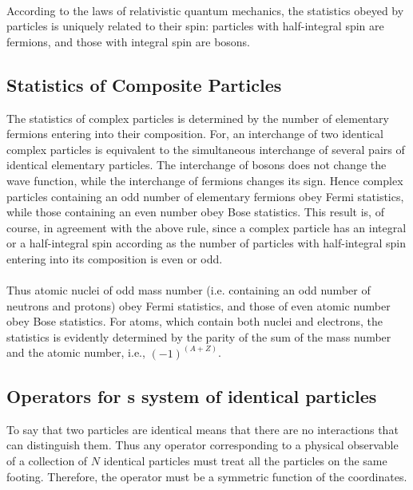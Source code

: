 \paragraph{}
According to the laws of relativistic 
quantum mechanics, the statistics obeyed by particles is uniquely 
related to their spin: particles with half-integral spin are fermions, 
and those with integral spin are bosons. 


\subsection{Statistics of Composite Particles}
The statistics of complex particles is determined by the 
number of elementary fermions entering into their composition. 
For, an interchange of two identical complex particles is equivalent to 
the simultaneous interchange of several pairs of identical elementary 
particles. The interchange of bosons does not change the wave function, 
while the interchange of fermions changes its sign. Hence complex 
particles containing an odd number of elementary fermions obey 
Fermi statistics, while those containing an even number obey Bose statistics. 
This result is, of course, in agreement with the above rule, since 
a complex particle has an integral or a half-integral spin according as 
the number of particles with half-integral spin entering into its 
composition is even or odd. 

\paragraph{}
Thus atomic nuclei of odd mass number (i.e. containing an odd 
number of neutrons and protons) obey Fermi statistics, and those of 
even atomic number obey Bose statistics. For atoms, which contain both 
nuclei and electrons, the statistics is evidently determined by the parity 
of the sum of the mass number and the atomic number, i.e., $(-1)^{(A+Z)}$.

\subsection{Operators for s system of identical particles}
To say that two particles are identical means that there are no interactions that can distinguish them. Thus
any operator corresponding to a physical observable of a collection of $N$ identical particles must treat all the
particles on the same footing. Therefore, the operator must be a symmetric function of the coordinates.

